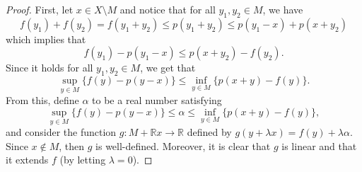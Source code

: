 \documentclass{article}
\newcommand{\R}{\mathbb{R}}
\begin{document}
\begin{proof}
    First, let $x \in X \setminus M$ and notice that for all $y_1, y_2 \in M$, we have
    $$f(y_1) + f(y_2) = f(y_1 + y_2) \leq p(y_1 + y_2) \leq p(y_1 - x) + p(x + y_2)$$
    which implies that
    $$f(y_1) - p(y_1 - x) \leq p(x + y_2) - f(y_2).$$
    Since it holds for all $y_1, y_2 \in M$, we get that
    $$\sup_{y \in M}\{f(y) - p(y - x)\} \leq \inf_{y \in M}\{p(x + y) - f(y)\}.$$
    From this, define $\alpha$ to be a real number satisfying
    $$\sup_{y \in M}\{f(y) - p(y - x)\} \leq \alpha \leq \inf_{y \in M}\{p(x + y) - f(y)\},$$
    and consider the function $g : M + \R x \to \R$ defined by $g(y + \lambda x) = f(y) + \lambda \alpha$. Since $x \notin M$, then $g$ is well-defined. Moreover, it is clear that $g$ is linear and that it extends $f$ (by letting $\lambda = 0$).


\end{proof}
\end{document}
